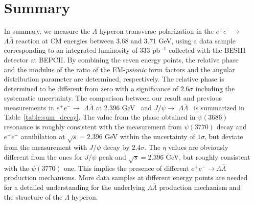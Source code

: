 \documentclass[a4paper,11pt]{article}
\begin{document}
\section{Summary}
In summary, we measure the $\Lambda$ hyperon transverse polarization in the $e^+e^-\to$ $\Lambda\bar{\Lambda}$ reaction
at CM energies between 3.68 and 3.71 GeV, using a data sample corresponding to an integrated luminosity of 333 pb$^{-1}$ collected with the BESIII detector at BEPCII. By combining the seven energy points, the relative phase and the modulus of the ratio of the EM-\textit{psionic} form factors and the angular distribution parameter are determined, 
 respectively.
 The relative phase is determined to be different from zero with a significance of 2.6$\sigma$ including the systematic uncertainty. 
 The comparison between our result and previous measurements in 
$e^+e^-\to$ $\Lambda\bar{\Lambda}$ at 2.396 GeV~\cite{BESIII:2019nep} and $J/\psi \to$ $\Lambda\bar{\Lambda}$~\cite{BESIII:2022yprl} is summarized in Table~\ref{table:sum_decay}. 
The value from the phase obtained in $\psi(3686)$ resonance is roughly consistent with the measurement from $\psi(3770)$ decay and $e^+e^-$ annihilation at $\sqrt{s} = 2.396$ GeV within the uncertainty of $1\sigma$, but deviate from the measurement with $J/\psi$ decay by 2.4$\sigma$.
The $\eta$ values are obviously different from the ones for $J/\psi$ peak and $\sqrt{s} = 2.396$ GeV, but roughly consistent with the $\psi(3770)$ one. This implies the presence of different $e^+e^-\to\Lambda\bar\Lambda$ production mechanisms.
More data samples at different energy points are needed
for a detailed understanding for the underlying $\Lambda\bar\Lambda$ production mechanism and the structure of the $\Lambda$ hyperon.
\end{document}
